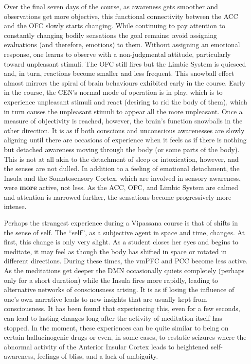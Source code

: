 \documentclass[a4paper, amsfonts, amssymb, amsmath, reprint, showkeys, nofootinbib, twoside]{revtex4-1}
\begin{document}
Over the final seven days of the course, as awareness gets smoother and observations get more objective, this
functional connectivity between the ACC and the OFC slowly starts changing. While
continuing to pay attention to constantly changing bodily sensations the goal remains: avoid
assigning evaluations (and therefore, emotions) to them. Without assigning an
emotional response, one learns to observe with a
non-judgmental attitude, particularly toward unpleasant stimuli. The OFC still fires
but the Limbic System is quiesced and, in turn, reactions become smaller and less
frequent. This snowball effect almost mirrors the spiral of brain behaviours
exhibited early in the course. Early in the course, the CEN's normal mode of
operation is in play, which is to experience unpleasant stimuli and react (desiring to rid the body of
them), which in turn causes the unpleasant stimuli to appear all the more
unpleasant. Once a measure of objectivity is reached, however, the brain's function
snowballs in the other direction. It is as if both conscious and unconscious awarenesses are slowly aligning
until there are occasions of experience when it feels as if there is nothing but detached awareness moving
through the body (or some parts of the body). This is not at all akin to the
detachment of sleep or intoxication, however, and the senses are not dulled. In
addition to a feeling of emotional detachment, the Insula and the Somatosensory
Cortex, which are involved in sensory awareness, were \textbf{more} active, not
less. As the ACC, OFC, and Limbic System are calmed and attention is narrowed
further, the sensations become progressively more intense.

Perhaps the strangest experience during a Vipassana course is that of shifts in the
sense of self. The ``self'', as a subjective agent in space and time, changes. At
first, this change is only very slight. As a student closes her eyes and begins to
meditate, it may feel as though
the body has shifted in space or rotated in different directions. During these times,
the vmPFC and PCC become less active.  As the meditations get deeper the DMN
occasionally quiets completely (perhaps only for a short duration) while the Insula
fires more rapidly, leading to alternative networks of consciousness
arising.  It is
as if losing the influence of one's own narrative leads to new insights that are
usually kept from consciousness. It has been found that experiencing this, even for a
few seconds, can lead to lasting changes long after the activity of meditation itself
has stopped. \cite{alteredtraits} In the moment, these experiences can be quite
similar to being on certain hallucinogenic drugs or even, in some cases, to ecstatic
seizures where the abnormal activity of the Anterior Insular Cortex leads to
heightened self-awareness, feelings of bliss, and a lack of ambiguity. \cite{cortexbliss}
\end{document}
